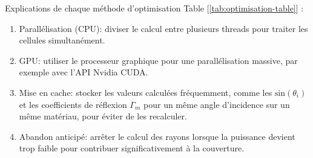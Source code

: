 Explications de chaque m{\'e}thode d'optimisation Table
[\ref{tab:optimisation-table}] :
\begin{enumerate}
  \item Parall{\'e}lisation (CPU): diviser le calcul entre plusieurs threads
  pour traiter les cellules simultan{\'e}ment.
  
  \item GPU: utiliser le processeur graphique pour une parall{\'e}lisation
  massive, par exemple avec l'API Nvidia CUDA.
  
  \item Mise en cache: stocker les valeurs calcul{\'e}es fr{\'e}quemment,
  comme les $\mathrm{sin}(\theta_i)$ et les coefficients de r{\'e}flexion $\Gamma_m$ pour un même angle d'incidence sur un même matériau, pour {\'e}viter de les
  recalculer.
  
  \item Abandon anticip{\'e}: arr{\^e}ter le calcul des rayons lorsque la
  puissance devient trop faible pour contribuer significativement {\`a} la
  couverture.
\end{enumerate}